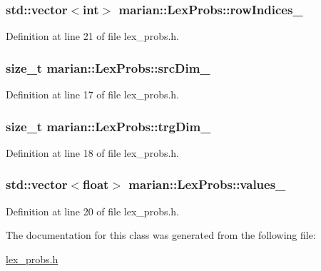 \subsubsection[{\texorpdfstring{row\+Indices\+\_\+}{rowIndices_}}]{\setlength{\rightskip}{0pt plus 5cm}std\+::vector$<$int$>$ marian\+::\+Lex\+Probs\+::row\+Indices\+\_\+\hspace{0.3cm}{\ttfamily [private]}}\hypertarget{classmarian_1_1LexProbs_af0877c33d19bcec0d40e3cc99946d93b}{}\label{classmarian_1_1LexProbs_af0877c33d19bcec0d40e3cc99946d93b}


Definition at line 21 of file lex\+\_\+probs.\+h.

\subsubsection[{\texorpdfstring{src\+Dim\+\_\+}{srcDim_}}]{\setlength{\rightskip}{0pt plus 5cm}size\+\_\+t marian\+::\+Lex\+Probs\+::src\+Dim\+\_\+\hspace{0.3cm}{\ttfamily [private]}}\hypertarget{classmarian_1_1LexProbs_a066f91b5a18aa4e703d36b2e5583a1d5}{}\label{classmarian_1_1LexProbs_a066f91b5a18aa4e703d36b2e5583a1d5}


Definition at line 17 of file lex\+\_\+probs.\+h.

\subsubsection[{\texorpdfstring{trg\+Dim\+\_\+}{trgDim_}}]{\setlength{\rightskip}{0pt plus 5cm}size\+\_\+t marian\+::\+Lex\+Probs\+::trg\+Dim\+\_\+\hspace{0.3cm}{\ttfamily [private]}}\hypertarget{classmarian_1_1LexProbs_aca81dfd4fe0b8a08e499cfeab3115950}{}\label{classmarian_1_1LexProbs_aca81dfd4fe0b8a08e499cfeab3115950}


Definition at line 18 of file lex\+\_\+probs.\+h.

\subsubsection[{\texorpdfstring{values\+\_\+}{values_}}]{\setlength{\rightskip}{0pt plus 5cm}std\+::vector$<$float$>$ marian\+::\+Lex\+Probs\+::values\+\_\+\hspace{0.3cm}{\ttfamily [private]}}\hypertarget{classmarian_1_1LexProbs_a12c2b523b16a3239d99fd69a6a463927}{}\label{classmarian_1_1LexProbs_a12c2b523b16a3239d99fd69a6a463927}


Definition at line 20 of file lex\+\_\+probs.\+h.



The documentation for this class was generated from the following file\+:\begin{DoxyCompactItemize}
\item 
\hyperlink{lex__probs_8h}{lex\+\_\+probs.\+h}\end{DoxyCompactItemize}
